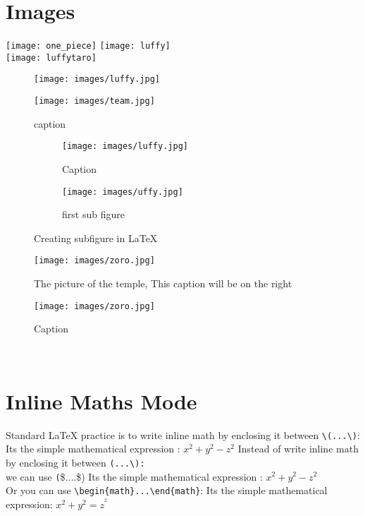 \documentclass{report}
\begin{document}
\section{Images}
\lipsum[1-2]
\texttt{[image: one\_piece]}
\texttt{[image: luffy]} \\
\texttt{[image: luffytaro]}
\lipsum[1-2]
\begin{wrapfigure}{r}{0.25\textwidth}
    \centering  
    \texttt{[image: images/luffy.jpg]}
\end{wrapfigure}
\lipsum[1-2]
\begin{figure}[b] %
    \centering
    \texttt{[image: images/team.jpg]}
    \caption{caption}
    \label{fig:enter-label}
\end{figure}
\lipsum[1-2]
\begin{figure}
    \centering
    \begin{subfigure}{0.4\textwidth}
       \texttt{[image: images/luffy.jpg]}
    \caption{Caption}
    \label{fig:enter-label} 
    \end{subfigure}
    \hfill
    \begin{subfigure}{0.4\textwidth}
        \texttt{[image: images/uffy.jpg]}
        \label{fig:first}
        \caption{first sub figure }
    \end{subfigure}
\caption{Creating subfigure in \LaTeX}
\label{fig:figures}
\end{figure}
\begin{SCfigure}[0.5][h]
    \caption{The picture of the temple, This caption will be on the right}
    \texttt{[image: images/zoro.jpg]}
\end{SCfigure}
\begin{figure}[h!]
    \centering
    \texttt{[image: images/zoro.jpg]}
    \caption{Caption}
    \label{fig:enter-label}
\end{figure}
\lipsum[1-2] \\
\section{Inline Maths Mode}

\noindent Standard \LaTeX{} practice is to write inline math by enclosing it between \verb|\(...\)|:\\
Its the simple mathematical expression : \(x^2+y^2-z^2\)
\noindent Instead of write inline math by enclosing it between \verb|(...\):|\\ we can use \texttt(\$....\$)
Its the simple mathematical expression : $x^2+y^2-z^2$ \\
\noindent Or you can use 
\verb|\begin{math}...\end{math}|:
Its the simple mathematical expression:
\begin{math}x^2+y^2=z^^2\end{math}
\end{document}
